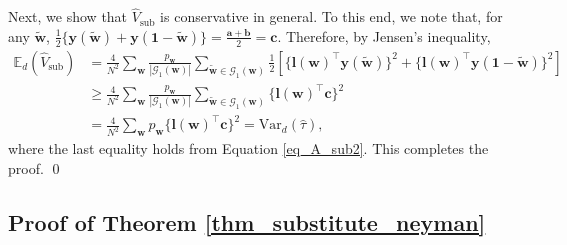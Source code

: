 \documentclass[12pt]{article}
\newcommand{\Var}{{\text{Var}}}
\newcommand{\E}{{\mathbb{E}}}
\begin{document}
Next, we show that $\hat{V}_{\text{sub}}$ is conservative in general. To this end, we note that, for any $\tilde{\bm{w}}$, $\frac{1}{2}\{\bm{y}(\tilde{\bm{w}}) + \bm{y}(\bm{1}-\tilde{\bm{w}})\} = \frac{\bm{a} + \bm{b}}{2} = \bm{c}$. Therefore, by Jensen's inequality,
\begin{align}
    \E_d(\hat{V}_{\text{sub}}) &=   \frac{4}{N^2}\sum_{\bm{w}}\frac{p_{\bm{w}}}{|\mathcal{G}_1(\bm{w})|} \sum_{\tilde{\bm{w}} \in \mathcal{G}_1(\bm{w})} \frac{1}{2}\left[\{\bm{l}(\bm{w})^\top \bm{y}(\tilde{\bm{w}})\}^2 + \{\bm{l}(\bm{w})^\top \bm{y}(\bm{1}-\tilde{\bm{w}})\}^2\right] \nonumber \\
    & \geq \frac{4}{N^2}\sum_{\bm{w}}\frac{p_{\bm{w}}}{|\mathcal{G}_1(\bm{w})|} \sum_{\tilde{\bm{w}} \in \mathcal{G}_1(\bm{w})} \{\bm{l}(\bm{w})^\top \bm{c}\}^2 \nonumber\\
    & = \frac{4}{N^2} \sum_{\bm{w}} p_{\bm{w}} \{\bm{l}(\bm{w})^\top \bm{c}\}^2 = \Var_d(\hat{\tau}),
\end{align}
where the last equality holds from Equation \ref{eq_A_sub2}. This completes the proof.
\qed


\subsection{Proof of Theorem \ref{thm_substitute_neyman}}
\end{document}
